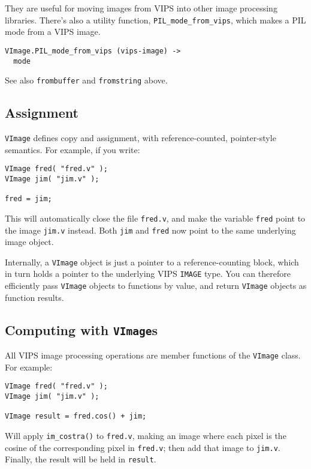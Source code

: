 They are useful for moving images from VIPS into other image processing
libraries. There's also a utility function, \verb+PIL_mode_from_vips+, which
makes a PIL mode from a VIPS image.

\begin{verbatim}
VImage.PIL_mode_from_vips (vips-image) -> 
  mode
\end{verbatim}

See also \verb+frombuffer+ and \verb+fromstring+ above.

\subsection{Assignment}

\verb+VImage+ defines copy and assignment, with reference-counted,
pointer-style semantics.  For example, if you write:

\begin{verbatim}
VImage fred( "fred.v" );
VImage jim( "jim.v" );

fred = jim;
\end{verbatim}

This will automatically close the file \verb+fred.v+, and make the variable
\verb+fred+ point to the image \verb+jim.v+ instead. Both \verb+jim+ and
\verb+fred+ now point to the same underlying image object. 

Internally, a \verb+VImage+ object is just a pointer to a reference-counting
block, which in turn holds a pointer to the underlying VIPS \verb+IMAGE+ type.
You can therefore efficiently pass \verb+VImage+ objects to functions by
value, and return \verb+VImage+ objects as function results.

\subsection{Computing with \texttt{VImage}s}
\label{sec:compute}

All VIPS image processing operations are member functions of the \verb+VImage+
class. For example:

\begin{verbatim}
VImage fred( "fred.v" );
VImage jim( "jim.v" );

VImage result = fred.cos() + jim;
\end{verbatim}

Will apply \verb+im_costra()+ to \verb+fred.v+, making an image where each
pixel is the cosine of the corresponding pixel in \verb+fred.v+; then add that
image to \verb+jim.v+. Finally, the result will be held in \verb+result+.


